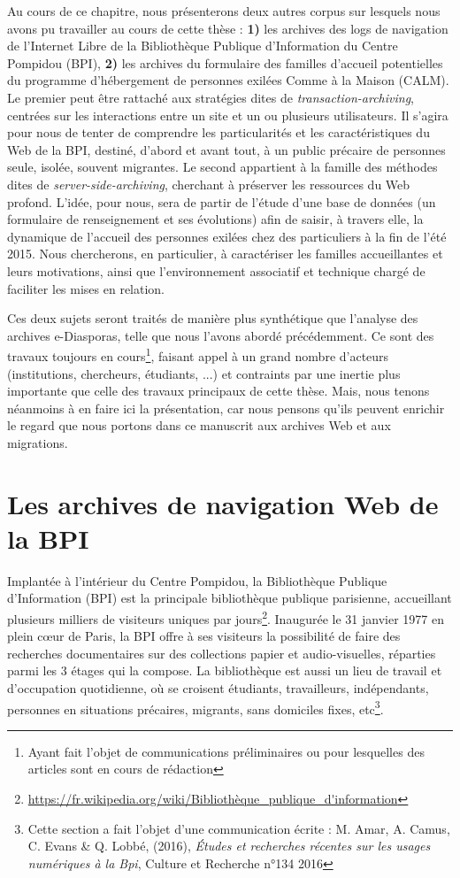 \documentclass[symmetric,justified,marginals=raggedouter]{tufte-book}
\begin{document}
Au cours de ce chapitre, nous présenterons deux autres corpus sur lesquels nous avons pu travailler au cours de cette thèse : \textbf{1)} les archives des logs de navigation de l'Internet Libre de la Bibliothèque Publique d'Information du Centre Pompidou (BPI), \textbf{2)} les archives du formulaire des familles d'accueil potentielles du programme d'héber\-gement de personnes exilées Comme à la Maison (CALM). Le premier peut être rattaché aux stratégies dites de \textit{transaction-archiving}, centrées sur les interactions entre un site et un ou plusieurs utilisateurs. Il s'agira pour nous de tenter de comprendre les particularités et les caractéristiques du Web de la BPI, destiné, d'abord et avant tout, à un public précaire de personnes seule, isolée, souvent migrantes. Le second appartient à la famille des méthodes dites de \textit{server-side-archiving}, cherchant à préserver les ressources du Web profond. L'idée, pour nous, sera de partir de l'étude d'une base de données (un formulaire de renseignement et ses évolutions) afin de saisir, à travers elle, la dynamique de l'accueil des personnes exilées chez des particuliers à la fin de l'été 2015. Nous chercherons, en particulier, à caractériser les familles accueillantes et leurs motivations, ainsi que l'environnement associatif et technique chargé de faciliter les mises en relation.  

Ces deux sujets seront traités de manière plus synthétique que l'ana\-lyse des archives e-Diasporas, telle que nous l'avons abordé précédemment. Ce sont des travaux toujours en cours\footnote{Ayant fait l'objet de communications préliminaires ou pour lesquelles des articles sont en cours de rédaction}, faisant appel à un grand nombre d'acteurs (institutions, chercheurs, étudiants, ...) et contraints par une inertie plus importante que celle des travaux principaux de cette thèse. Mais, nous tenons néanmoins à en faire ici la présentation, car nous pensons qu'ils peuvent enrichir le regard que nous portons dans ce manuscrit aux archives Web et aux migrations.   

\section{Les archives de navigation Web de la BPI}

\noindent Implantée à l'intérieur du Centre Pompidou, la Bibliothèque Publique d'Information (BPI) est la principale bibliothèque publique parisienne, accueillant plusieurs milliers de visiteurs uniques par jours\footnote{\url{https://fr.wikipedia.org/wiki/Bibliothèque\_publique\_d'information}}. Inaugurée le 31 janvier 1977 en plein cœur de Paris, la BPI offre à ses visiteurs la possibilité de faire des recherches documentaires sur des collections papier et audio-visuelles, réparties parmi les 3 étages qui la compose. La bibliothèque est aussi un lieu de travail et d'occupation quotidienne, où se croisent étudiants, travailleurs, indépendants, personnes en situations précaires, migrants, sans domiciles fixes, etc\footnote{Cette section a fait l'objet d'une communication écrite : M. Amar, A. Camus, C. Evans \& Q. Lobbé, (2016), \textit{Études et recherches récentes sur les usages numériques à la Bpi}, Culture et Recherche n°134 2016}.  
\end{document}
